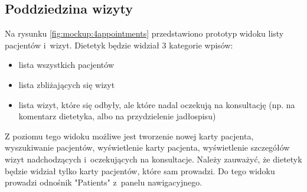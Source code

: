 







\subsection{Poddziedzina wizyty}

Na rysunku \ref{fig:mockup:4appointments} przedstawiono prototyp widoku listy pacjentów i~wizyt.
Dietetyk będzie widział 3 kategorie wpisów:
\begin{itemize}
    \item lista wszystkich pacjentów
    \item lista zbliżających się wizyt
    \item lista wizyt, które się odbyły, ale które nadal oczekują na konsultację (np. na komentarz dietetyka, albo na przydzielenie jadłospisu)
\end{itemize}
Z poziomu tego widoku możliwe jest tworzenie nowej karty pacjenta, wyszukiwanie pacjentów, wyświetlenie karty pacjenta, wyświetlenie szczegółów wizyt nadchodzących i~oczekujących na konsultacje.
Należy zauważyć, że dietetyk będzie widział tylko karty pacjentów, które sam prowadzi.
Do tego widoku prowadzi odnośnik "Patients" z~panelu nawigacyjnego.

